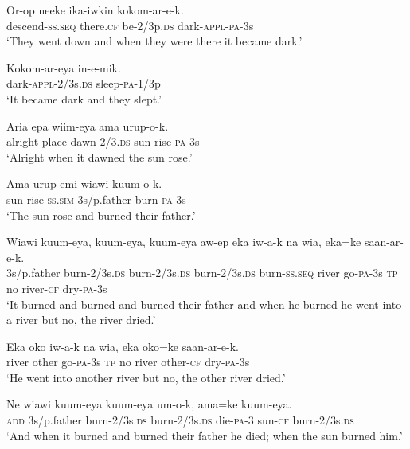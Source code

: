 \ea
\gll  Or-op  neeke  ika-iwkin  kokom-ar-e-k. \\
descend-\textsc{ss.seq}  there.\textsc{cf}  be-2/3p.\textsc{ds}  dark-\textsc{appl}-\textsc{pa}-3s \\
\glt ‘They went down and when they were there it became dark.’ \\
\z


\ea
\gll  Kokom-ar-eya  in-e-mik. \\
dark-\textsc{appl}-2/3s.\textsc{ds}  sleep-\textsc{pa}-1/3p \\
\glt ‘It became dark and they slept.’ \\
\z


\ea
\gll  Aria  epa  wiim-eya  ama  urup-o-k. \\
alright  place  dawn-2/3.\textsc{ds}  sun  rise-\textsc{pa}-3s \\
\glt ‘Alright when it dawned the sun rose.’ \\
\z


\ea
\gll  Ama  urup-emi  wiawi  kuum-o-k. \\
sun  rise-\textsc{ss}.\textsc{sim}  3s/p.father  burn-\textsc{pa}-3s \\
\glt ‘The sun rose and burned their father.’ \\
\z


\ea
\gll  Wiawi  kuum-eya,  kuum-eya,  kuum-eya  aw-ep                  eka  iw-a-k  na  wia,  eka=ke  saan-ar-e-k. \\
3s/p.father  burn-2/3s.\textsc{ds}  burn-2/3s.\textsc{ds}  burn-2/3s.\textsc{ds}  burn-\textsc{ss.seq}  river  go-\textsc{pa}-3s  \textsc{tp}  no  river-\textsc{cf}  dry-\textsc{pa}-3s \\


\glt ‘It burned and burned and burned their father and when he burned he went into a river but no, the river dried.’ \\
\z


\ea
\gll  Eka  oko  iw-a-k  na  wia,  eka  oko=ke  saan-ar-e-k. \\
river  other  go-\textsc{pa}-3s  \textsc{tp}  no  river  other-\textsc{cf}  dry-\textsc{pa}-3s \\
\glt ‘He went into another river but no, the other river dried.’ \\
\z


\ea
\gll  Ne  wiawi  kuum-eya  kuum-eya  um-o-k,  ama=ke  kuum-eya. \\
\textsc{add}  3s/p.father  burn-2/3s.\textsc{ds}  burn-2/3s.\textsc{ds}  die-\textsc{pa}-3  sun-\textsc{cf}  burn-2/3s.\textsc{ds} \\
\glt ‘And when it burned and burned their father he died; when the sun burned him.’ \\
\z


